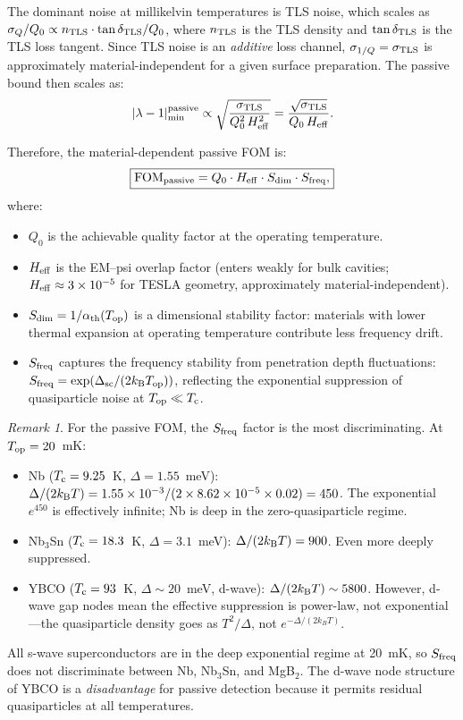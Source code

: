 \documentclass[11pt]{article}
\theoremstyle{definition}
\theoremstyle{remark}
\newtheorem{remark}[theorem]{Remark}
\newcommand{\ee}[1]{\times 10^{#1}}
\newcommand{\Tc}{T_{\rm c}}
\newcommand{\FOMpassive}{\mathrm{FOM}_{\rm passive}}
\newcommand{\lam}{|\lambda-1|}
\newcommand{\Heff}{H_{\rm eff}}
\begin{document}
The dominant noise at millikelvin temperatures is TLS noise, which scales
as $\sigma_Q/Q_0 \propto n_{\rm TLS}\cdot\tan\delta_{\rm TLS}/Q_0$,
where $n_{\rm TLS}$ is the TLS density and $\tan\delta_{\rm TLS}$ is
the TLS loss tangent. Since TLS noise is an \emph{additive} loss channel,
$\sigma_{1/Q} = \sigma_{\rm TLS}$ is approximately material-independent
for a given surface preparation. The passive bound then scales as:
\begin{equation}
  \lam_{\rm min}^{\rm passive} \propto
  \sqrt{\frac{\sigma_{\rm TLS}}{Q_0^2\,\Heff^2}}
  = \frac{\sqrt{\sigma_{\rm TLS}}}{Q_0\,\Heff}.
\end{equation}

Therefore, the material-dependent passive FOM is:
\begin{equation}
\boxed{
  \FOMpassive = Q_0 \cdot \Heff \cdot S_{\rm dim} \cdot S_{\rm freq},
}
\label{eq:FOM_passive}
\end{equation}
where:
\begin{itemize}[nosep]
  \item $Q_0$ is the achievable quality factor at the operating temperature.
  \item $\Heff$ is the EM--psi overlap factor (enters weakly for bulk
    cavities; $\Heff \approx 3\ee{-5}$ for TESLA geometry, approximately
    material-independent).
  \item $S_{\rm dim} = 1/\alpha_{\rm th}(T_{\rm op})$ is a dimensional
    stability factor: materials with lower thermal expansion at operating
    temperature contribute less frequency drift.
  \item $S_{\rm freq}$ captures the frequency stability from penetration
    depth fluctuations: $S_{\rm freq} = \exp(\Delta_{\rm sc}/(2k_{\rm B}T_{\rm op}))$,
    reflecting the exponential suppression of quasiparticle noise at
    $T_{\rm op} \ll \Tc$.
\end{itemize}

\begin{remark}
For the passive FOM, the $S_{\rm freq}$ factor is the most discriminating.
At $T_{\rm op} = 20$~mK:
\begin{itemize}[nosep]
  \item Nb ($\Tc = 9.25$~K, $\Delta = 1.55$~meV):
    $\Delta/(2k_{\rm B}T) = 1.55\ee{-3}/(2\times 8.62\ee{-5}\times 0.02)
    = 450$. The exponential $e^{450}$ is effectively infinite; Nb is
    deep in the zero-quasiparticle regime.
  \item Nb$_3$Sn ($\Tc = 18.3$~K, $\Delta = 3.1$~meV):
    $\Delta/(2k_{\rm B}T) = 900$. Even more deeply suppressed.
  \item YBCO ($\Tc = 93$~K, $\Delta \sim 20$~meV, d-wave):
    $\Delta/(2k_{\rm B}T) \sim 5800$. However, d-wave gap nodes mean
    the effective suppression is power-law, not exponential---the
    quasiparticle density goes as $T^2/\Delta$, not $e^{-\Delta/(2k_BT)}$.
\end{itemize}
All s-wave superconductors are in the deep exponential regime at 20~mK,
so $S_{\rm freq}$ does not discriminate between Nb, Nb$_3$Sn, and MgB$_2$.
The d-wave node structure of YBCO is a \emph{disadvantage} for passive
detection because it permits residual quasiparticles at all temperatures.
\end{remark}
\end{document}
